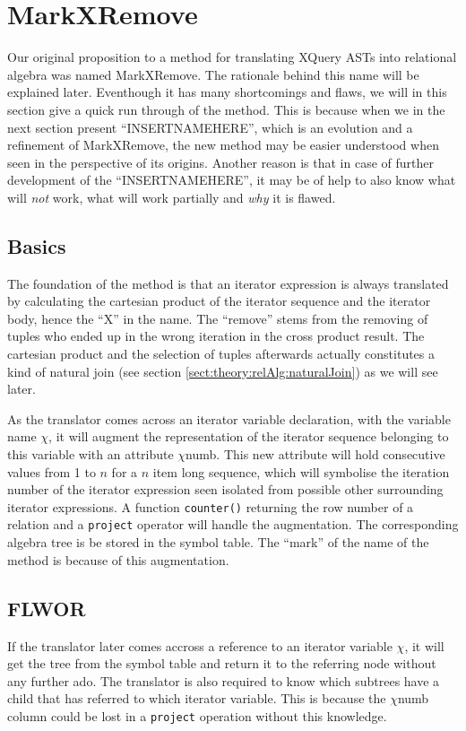 \section{MarkXRemove}
\label{sect:translation:MarkXRemove}

Our original proposition to a method for translating XQuery ASTs into relational algebra was named MarkXRemove.
The rationale behind this name will be explained later. Eventhough it has many shortcomings and flaws, we
will in this section give a quick run through of the method. This is because when we in the next section present
``INSERTNAMEHERE'', which is an evolution and a refinement of MarkXRemove, the new method may be easier understood
when seen in the perspective of its origins. Another reason is that in case of further development of the
``INSERTNAMEHERE'', it may be of help to also know what will \textit{not} work, what will work partially and
\textit{why} it is flawed.

\subsection{Basics}
\label{sect:translation:mxr:basics}

The foundation of the method is that an iterator expression is always translated by calculating the cartesian
product of the iterator sequence and the iterator body, hence the ``X'' in the name. The ``remove'' stems from the
removing of tuples who ended up in the wrong iteration in the cross product result. The cartesian product and the
selection of tuples afterwards actually constitutes a kind of natural join (see section
\ref{sect:theory:relAlg:naturalJoin}) as we will see later.

As the translator comes across an iterator variable declaration, with the variable name $\chi$, it will augment
the representation of the iterator sequence belonging to this variable with an attribute $\chi$\textsf{numb}.
This new attribute will hold consecutive values from 1 to $n$ for a $n$ item long sequence, which will symbolise the
iteration number of the iterator expression seen isolated from possible other surrounding iterator expressions. A
function \texttt{counter()} returning the row number of a relation and a \texttt{project} operator will handle
the augmentation. The corresponding algebra tree is be stored in the symbol table. The ``mark'' of the name of the
method is because of this augmentation.

\subsection{FLWOR}
\label{sect:translation:mxr:flwor}
If the translator later comes accross a reference to an iterator variable $\chi$, it will get the tree from the
symbol table and return it to the referring node without any further ado. The translator is also required to know
which subtrees have a child that has referred to which iterator variable. This is because the $\chi$\textsf{numb}
column could be lost in a \texttt{project} operation without this knowledge.

